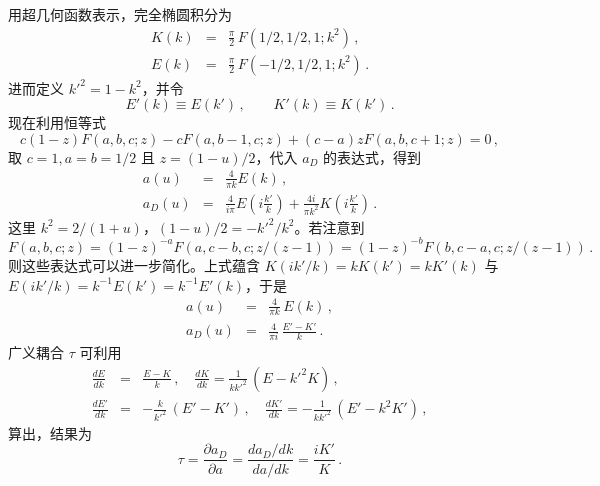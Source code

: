 
用超几何函数表示，完全椭圆积分为
\begin{eqnarray}
K(k) &=& \frac{\pi}{2}\, F\left(1/2, 1/2, 1; k^2\right)\,,\nonumber\\
E(k) &=& \frac{\pi}{2}\, F\left(-1/2, 1/2, 1; k^2\right)\,.\nonumber
\end{eqnarray}
进而定义 $k'^2=1-k^2$，并令
$$
E'(k)\equiv E(k')\,,\qquad K'(k) \equiv K(k')\,.
$$ 
现在利用恒等式
$$
c(1-z)F(a,b,c;z) - c F(a,b-1,c;z) + (c-a)z F(a,b,c+1;z)=0\,,
$$ 
取 $c=1, a=b=1/2$ 且 $z=(1-u)/2$，代入 $a_D$ 的表达式，得到
\begin{eqnarray}
a(u)   &=& \frac{4}{\pi k} E(k)\,,\nonumber\\
a_D(u) &=& \frac{4}{i\pi} E(i\frac{k'}{k}) + 
\frac{4i}{\pi k^2} K(i\frac{k'}{k})\,.\nonumber
\end{eqnarray}
这里 $k^2=2/(1+u)$，$(1-u)/2=-k'^2/k^2$。若注意到
$$
F(a, b, c; z)=(1-z)^{-a} F(a, c-b, c; z/(z-1))=
(1-z)^{-b} F(b, c-a, c; z/(z-1))\,.
$$
则这些表达式可以进一步简化。上式蕴含 $K(ik'/k)=kK(k')=kK'(k)$ 与
$E(ik'/k)=k^{-1}E(k')=k^{-1}E'(k)$，于是
\begin{eqnarray}
a(u)  &=& \frac{4}{\pi k}\, E(k)\,,\nonumber\\
a_D(u)&=& \frac{4}{\pi i}\,\frac{E'-K'}{k}\,.\nonumber
\end{eqnarray}
广义耦合 $\tau$ 可利用
\begin{eqnarray}
\frac{dE}{dk}&=&\frac{E-K}{k}\,,\quad 
\frac{dK}{dk}=\frac{1}{kk'^2}\,(E-k'^2 K)\,,\nonumber\\
\frac{dE'}{dk}&=&-\frac{k}{k'^2}\,(E'-K')\,,\quad 
\frac{dK'}{dk}=-\frac{1}{kk'^2}\,(E'-k^2 K')\,,\nonumber
\end{eqnarray}
算出，结果为
$$
\tau=\frac{\partial a_D}{\partial a}=\frac{da_D/dk}{da/dk}
=\frac{iK'}{K}\,.
$$



